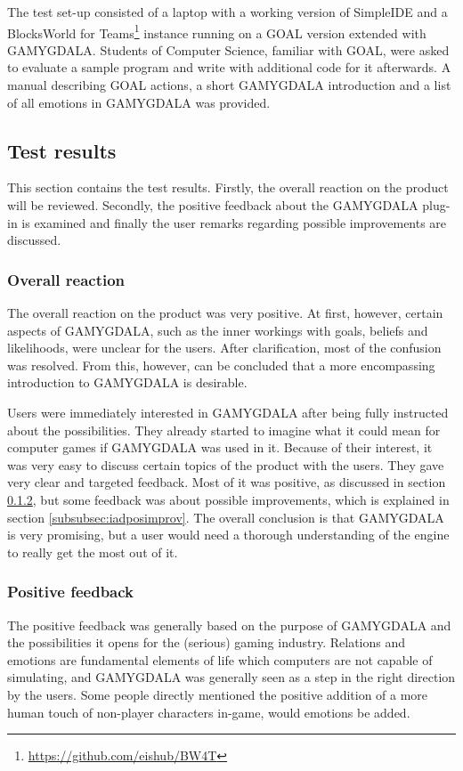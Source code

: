 The test set-up consisted of a laptop with a working version of SimpleIDE and a BlocksWorld for Teams\footnote{\url{https://github.com/eishub/BW4T}} instance running on a GOAL version extended with GAMYGDALA. Students of Computer Science, familiar with GOAL, were asked to evaluate a sample program and write with additional code for it afterwards. A manual describing GOAL actions, a short GAMYGDALA introduction and a list of all emotions in GAMYGDALA was provided. \clearpage

\subsection{Test results}
\label{subsec:iadres}
This section contains the test results. Firstly, the overall reaction on the product will be reviewed. Secondly, the positive feedback about the GAMYGDALA plug-in is examined and finally the user remarks regarding possible improvements are discussed.

\subsubsection{Overall reaction}
The overall reaction on the product was very positive. At first, however, certain aspects of GAMYGDALA, such as the inner workings with goals, beliefs and likelihoods, were unclear for the users. After clarification, most of the confusion was resolved. From this, however, can be concluded that a more encompassing introduction to GAMYGDALA is desirable.

Users were immediately interested in GAMYGDALA after being fully instructed about the possibilities. They already started to imagine what it could mean for computer games if GAMYGDALA was used in it. Because of their interest, it was very easy to discuss certain topics of the product with the users. They gave very clear and targeted feedback.  Most of it was positive, as discussed in section \ref{subsubsec:iadposfeedb}, but some feedback was about possible improvements, which is explained in section \ref{subsubsec:iadposimprov}. The overall conclusion is that GAMYGDALA is very promising, but a user would need a thorough understanding of the engine to really get the most out of it.

\subsubsection{Positive feedback}
\label{subsubsec:iadposfeedb}
The positive feedback was generally based on the purpose of GAMYGDALA and the possibilities it opens for the (serious) gaming industry. Relations and emotions are fundamental elements of life which computers are not capable of simulating, and GAMYGDALA was generally seen as a step in the right direction by the users. Some people directly mentioned the positive addition of a more human touch of non-player characters in-game, would emotions be added.\\


